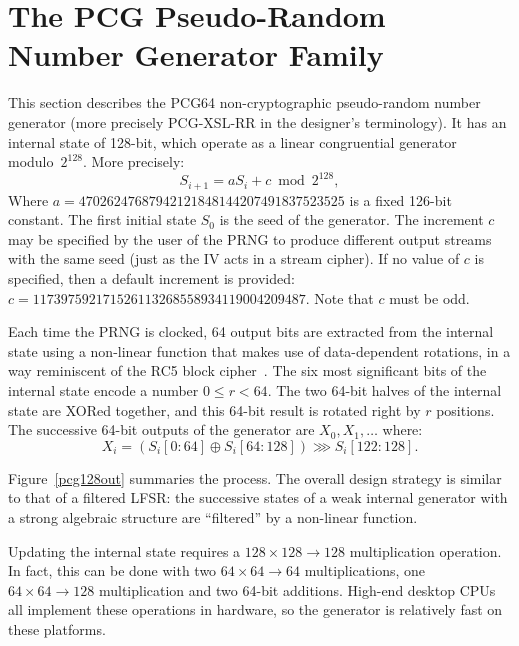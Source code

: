 \documentclass[preprint,svgnames]{iacrtrans}
\begin{document}
\section{The PCG Pseudo-Random Number Generator Family}

This section describes the \textsf{PCG64} non-cryptographic pseudo-random number
generator (more precisely \textsf{PCG-XSL-RR} in the designer's terminology). It
has an internal state of 128-bit, which operate as a linear congruential
generator modulo~$2^{128}$. More precisely:
\[
  S_{i+1} = a S_i + c \bmod 2^{128},
\]
Where $a = 47026247687942121848144207491837523525$ is a fixed 126-bit
constant. The first initial state $S_0$ is the seed of the generator. The
increment $c$ may be specified by the user of the PRNG to produce different
output streams with the same seed (just as the IV acts in a stream cipher). If
no value of $c$ is specified, then a default increment is provided:
$c = 117397592171526113268558934119004209487$. Note that $c$ must be odd.

Each time the PRNG is clocked, 64 output bits are extracted from the internal
state using a non-linear function that makes use of data-dependent rotations, in
a way reminiscent of the \textsf{RC5} block cipher~\cite{Rivest94}. The six most
significant bits of the internal state encode a number $0 \leq r < 64$. The two
64-bit halves of the internal state are XORed together, and this 64-bit result
is rotated right by $r$ positions. The successive 64-bit outputs of the
generator are $X_0, X_1, \dots$ where:
\begin{equation}\label{eq:output}
  X_i =(S_i[0:64] \oplus S_i[64:128]) \ggg S_i[122:128].
\end{equation}

Figure~\ref{pcg128out} summaries the process. The overall design strategy is
similar to that of a filtered LFSR: the successive states of a weak internal
generator with a strong algebraic structure are ``filtered'' by a non-linear
function.

Updating the internal state requires a $128 \times 128 \rightarrow 128$
multiplication operation. In fact, this can be done with two
$64 \times 64 \rightarrow 64$ multiplications, one
$64 \times 64 \rightarrow 128$ multiplication and two 64-bit additions. High-end
desktop CPUs all implement these operations in hardware, so the generator is
relatively fast on these platforms.
\end{document}
